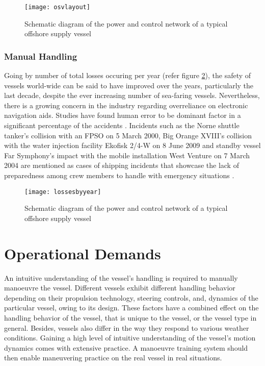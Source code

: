 \begin{figure}
	\centering
	\texttt{[image: osvlayout]}
	\caption{Schematic diagram of the power and control network of a typical offshore supply vessel}
	\label{fig:osvlayout}
\end{figure}

\subsubsection{Manual Handling}
Going by number of total losses occuring per year (refer figure \ref{fig:lossesbyyear}), the safety of vessels world-wide can be said to have improved over the years, particularly the last decade, despite the ever increasing number of sea-faring vessels. Nevertheless, there is a growing concern in the industry regarding overreliance on electronic navigation aids. Studies have found human error to be dominant factor in a significant percentage of the accidents \cite{baker2005accident, hauff2014analysis}. Incidents such as the Norne shuttle tanker's collision with an FPSO on 5 March 2000, Big Orange XVIII's collision with the water injection facility Ekofisk 2/4-W on 8 June 2009 and standby vessel Far Symphony's impact with the mobile installation West Venture on 7 March 2004 are mentioned as cases of shipping incidents that showcase the lack of preparedness among crew members to handle with emergency situations \cite{vinnem2013offshore}.

\begin{figure}
	\centering
	\texttt{[image: lossesbyyear]}
	\caption{Schematic diagram of the power and control network of a typical offshore supply vessel}
	\label{fig:lossesbyyear}
\end{figure}

\section{Operational Demands}
\label{sec:operationaldemands}
An intuitive understanding of the vessel’s handling is required to manually manoeuvre the vessel. Different vessels exhibit different handling behavior depending on their propulsion technology, steering controls, and, dynamics of the particular vessel, owing to its design. These factors have a combined effect on the handling behavior of the vessel, that is unique to the vessel, or the vessel type in general. Besides, vessels also differ in the way they respond to various weather conditions. 
Gaining a high level of intuitive understanding of the vessel’s motion dynamics comes with extensive practice. A manoeuvre training system should then enable maneuvering practice on the real vessel in real situations.

